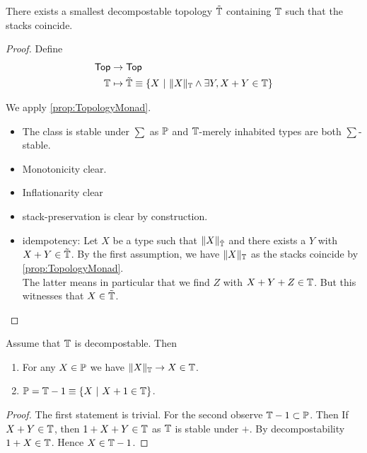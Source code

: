 \begin{prop}
	There exists a smallest decompostable topology $\tilde {\mathbb{T}}$ containing $\mathbb{T}$ such that the stacks coincide.	
\end{prop}
\begin{proof}
	Define
\begin{align*}
	\Top &\to \Top \\
	\bT &\mapsto \tilde \bT \equiv \{X \ | \ \|X\|_{\bT} \land \exists Y , X + Y \in \bT \} %
\end{align*}

	We apply \ref{prop:TopologyMonad}.
	\begin{itemize}
		\item 	The class is stable under $\sum$  as $\mathbb{P}$ and $\mathbb{T}$-merely inhabited types are both  $\sum$-stable. \\
		\item Monotonicity clear.
		\item Inflationarity clear
		\item stack-preservation is clear by construction.
	\item idempotency: %
Let $X$ be a type such that $\|X\|_{\tilde {\mathbb{T}}}$ and there exists a $Y$  with $X + Y \in \tilde {\mathbb{T}}$. By the first assumption, we have $\|X\|_{\mathbb{T}}$ as the stacks coincide by \ref{prop:TopologyMonad}. \\
The latter means in particular that we find $Z$ with $X + Y + Z \in \mathbb{T}$. But this witnesses that $X  \in \tilde {\mathbb{T}}$.		
\end{itemize}

\end{proof}
\begin{prop}
	Assume that $\mathbb{T}$ is decompostable. Then 
	\begin{enumerate}
			\item For any $X \in \mathbb{P}$ we have $\|X\|_{\mathbb{T}} \to X \in \mathbb{T}$.
			\item $\mathbb{P} = \mathbb{T} - 1 \equiv \{X \ | \ X + 1 \in \mathbb{T}\}$.
	\end{enumerate}
\end{prop}
\begin{proof}
	The first statement is trivial.
	For the second observe $\mathbb{T} - 1 \subset \mathbb{P}$. Then If $X + Y \in \mathbb{T}$, then $1 + X + Y \in \mathbb{T}$ as $\mathbb{T}$ is stable under $+$. By decompostability $1 + X \in \mathbb{T}$. Hence $X \in \mathbb{T} - 1$. %
	
\end{proof}